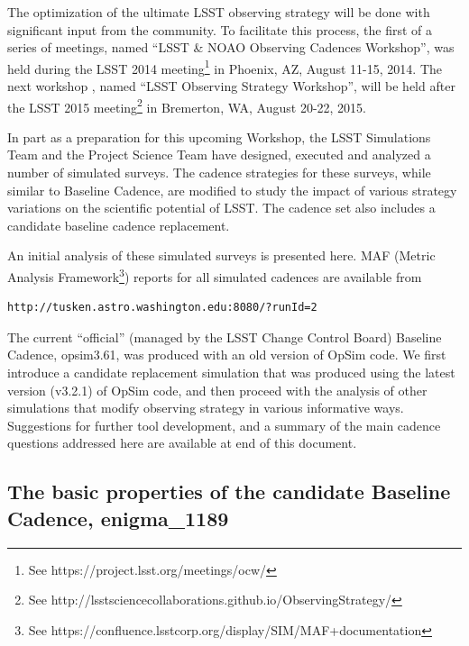 \documentclass[manuscript]{article}
\begin{document}
The optimization of the ultimate LSST observing strategy will be done with significant input from 
the community. To facilitate this process, the first of a series of meetings, named ``LSST \& NOAO 
Observing Cadences Workshop'', was held during the LSST 2014 meeting\footnote{See https://project.lsst.org/meetings/ocw/}
in Phoenix, AZ, August 11-15, 2014. The next workshop , named ``LSST 
Observing Strategy Workshop'',  will be held after the LSST 2015 meeting\footnote{See http://lsstsciencecollaborations.github.io/ObservingStrategy/}
in Bremerton, WA, August 20-22, 2015. 

In part as a preparation for this upcoming Workshop, the LSST Simulations Team and the Project
Science Team have designed, executed and analyzed a number of simulated surveys. 
The cadence strategies for these surveys, while similar to Baseline Cadence, are modified to 
study the impact of various strategy variations on the scientific potential of LSST. The cadence
set also includes a candidate baseline cadence replacement. 

An initial analysis of these simulated surveys is presented here. 
MAF (Metric Analysis Framework\footnote{See https://confluence.lsstcorp.org/display/SIM/MAF+documentation}) 
reports for all simulated cadences are available from
\begin{verbatim}
http://tusken.astro.washington.edu:8080/?runId=2
\end{verbatim}

The current ``official'' (managed by the LSST Change Control Board) Baseline Cadence, opsim3.61, 
was produced with an old version of OpSim
code. We first introduce a candidate replacement simulation that was produced using 
the latest version (v3.2.1) of OpSim code, and then proceed with the analysis of other
simulations that modify observing strategy in various informative ways. Suggestions
for further tool development, and a summary of the main cadence questions addressed 
here are available at end of this document. 


\subsection{The basic properties of the candidate Baseline Cadence, enigma\_1189} 
\end{document}
